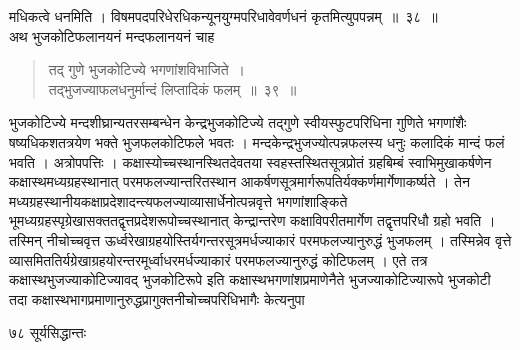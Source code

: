 \documentclass[11pt, openany]{book}
\begin{document}
\begin{sloppypar}
\noindent मधिकत्वे धनमिति । विषमपदपरिधेरधिकन्यूनयुग्मपरिधावेवर्णधनं कृतमित्युपपन्नम्~॥~३८~॥\\
\noindent अथ भुजकोटिफलानयनं मन्दफलानयनं चाह\textendash
\end{sloppypar}
\begin{quote}

{\ssi तद् गुणे भुजकोटिज्ये भगणांशविभाजिते~।\\
तद्भुजज्याफलधनुर्मान्दं लिप्तादिकं फलम्~॥~३९~॥}
\end{quote}
\begin{sloppypar}
भुजकोटिज्ये मन्दशीघ्रान्यतरसम्बन्धेन केन्द्रभुजकोटिज्ये तद्गुणे स्वीयस्फुटपरिधिना गुणिते भगणांशैः षष्यधिकशतत्रयेण भक्ते भुजफलकोटिफले भवतः । मन्दकेन्द्रभुजज्योत्पन्नफलस्य धनुः कलादिकं मान्दं फलं भवति । अत्रोपपत्तिः । कक्षास्योच्चस्थानस्थितदेवतया स्वहस्तस्थितसूत्रप्रोतं ग्रहबिम्बं स्वाभिमुखाकर्षणेन कक्षास्थमध्यग्रहस्थानात् परमफलज्यान्तरितस्थान आकर्षणसूत्रमार्गरूपतिर्यक्कर्णमार्गेणाकर्ष्यते । तेन मध्यग्रहस्थानीयकक्षाप्रदेशादन्त्यफलज्याव्यासार्धेनोत्पन्नवृत्ते भगणांशाङ्किते भूमध्यग्रहस्पृग्रेखासक्ततद्वृत्तप्रदेशरूपोच्चस्थानात् केन्द्रान्तरेण कक्षाविपरीतमार्गेण तद्वृत्तपरिधौ ग्रहो भवति । तस्मिन् नीचोच्चवृत्त ऊर्ध्वरेखाग्रहयोस्तिर्यगन्तरसूत्रमर्धज्याकारं परमफलज्यानुरुद्धं भुजफलम् । तस्मिन्नेव वृत्ते व्यासमिततिर्यग्रेखाग्रहयोरन्तरमूर्ध्वाधरमर्धज्याकारं परमफलज्यानुरुद्धं कोटिफलम् । एते तत्र कक्षास्थभुजज्याकोटिज्यावद् भुजकोटिरूपे इति कक्षास्थभगणांशप्रमाणेनैते भुजज्याकोटिज्यारूपे भुजकोटी तदा कक्षास्थभागप्रमाणानुरुद्धप्रागुक्तनीचोच्चपरिधिभागैः केत्यनुपा\textendash
\end{sloppypar}

\newpage

\noindent ७८ \hspace{4cm} सूर्यसिद्धान्तः
\vspace{1cm}
\end{document}
